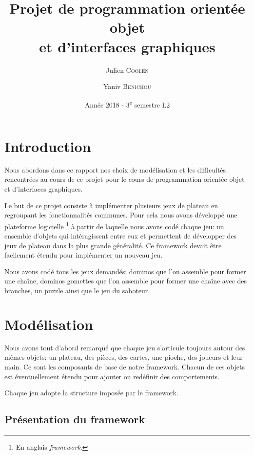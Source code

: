 \documentclass[a4paper, 11pt, DIV=9]{scrartcl}
\title{Projet de programmation orientée objet \\ et d'interfaces graphiques}
\author{Julien \textsc{Coolen} \and Yaniv \textsc{Benichou}}
\date{Année 2018 - 3\textsuperscript{e} semestre L2}
\begin{document}
\maketitle

\section{Introduction}

Nous abordons dans ce rapport nos choix de modélisation et
les difficultés rencontrées au cours de ce projet pour le cours de
programmation orientée objet et d’interfaces graphiques.

Le but de ce projet consiste à implémenter plusieurs jeux de
plateau en regroupant les fonctionnalités communes. Pour cela
nous avons développé une plateforme logicielle \footnote{En anglais \textit{framework}.} à partir
de laquelle nous avons codé chaque jeu: un ensemble d'objets qui intéragissent
entre eux et permettent de développer des jeux de plateau dans la plus grande
généralité. Ce framework devait être facilement étendu pour implémenter un
nouveau jeu.

Nous avons codé tous les jeux demandés: dominos que l'on assemble pour former
une chaîne, dominos gomettes que l'on assemble pour former une chaîne avec des
branches, un puzzle ainsi que le jeu du saboteur.


\section{Modélisation}

Nous avons tout d'abord remarqué que chaque jeu s'articule toujours autour des mêmes objets:
un plateau, des pièces, des cartes, une pioche, des joueurs et leur main.
Ce sont les composants de base de notre framework. Chacun de ces objets est
éventuellement étendu pour ajouter ou redéfinir des comportements.

Chaque jeu adopte la structure imposée par le framework.

\subsection{Présentation du framework}

\end{document}
